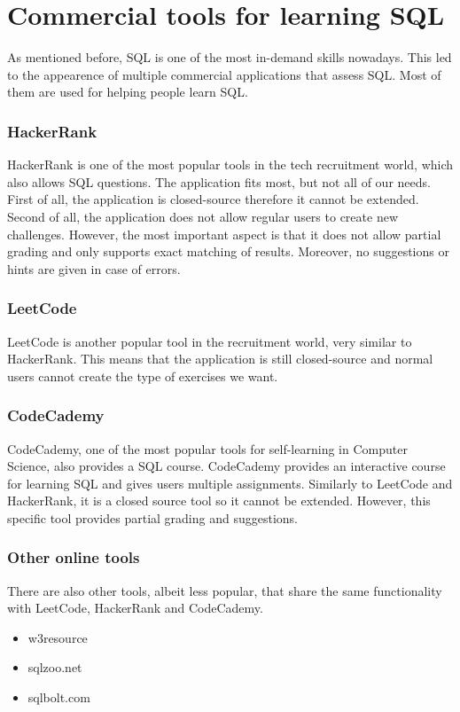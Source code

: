 \section{Commercial tools for learning SQL} \label{ch:lit:sec:tutor:comercial}

As mentioned before, SQL is one of the most in-demand skills
nowadays. This led to the appearence of multiple commercial 
applications that assess SQL. Most of them are used for helping people
learn SQL.

\subsubsection{HackerRank}
HackerRank is one of the most popular tools in the tech recruitment world,
which also allows SQL questions. The application fits most, but not all of our
needs. First of all, the application is closed-source therefore it cannot be extended. Second of all, the application does not allow regular
users to create new challenges. However, the most important aspect is
that it does not allow partial grading and only supports exact matching
of results. Moreover, no suggestions or hints are given in case of errors.

\subsubsection{LeetCode}
LeetCode is another popular tool in the recruitment world, very similar to
HackerRank. This means that the application is still closed-source and
normal users cannot create the type of exercises we want.

\subsubsection{CodeCademy}
CodeCademy, one of the most popular tools for self-learning in Computer
Science, also provides a SQL course. CodeCademy provides an interactive
course for learning SQL and gives users multiple assignments.
Similarly to LeetCode and HackerRank, it is a closed source tool so it cannot be
extended. However, this specific tool provides partial grading and suggestions.

\subsubsection{Other online tools}
There are also other tools, albeit less popular, that share the same functionality with LeetCode, HackerRank and CodeCademy.
\begin{itemize}
    \item w3resource
    \item sqlzoo.net
    \item sqlbolt.com
\end{itemize}

